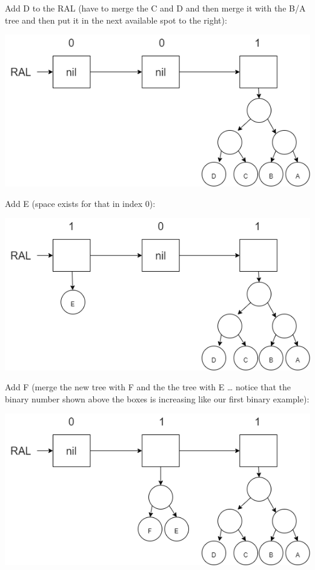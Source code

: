 \documentclass[
]{book}
\begin{document}
Add D to the RAL (have to merge the C and D and then merge it with the B/A tree and then put it in the next available spot to the right):

\includegraphics{images/ral4.drawio.png}

Add E (space exists for that in index 0):

\includegraphics{images/ral5.drawio.png}

Add F (merge the new tree with F and the the tree with E \ldots{} notice that the binary number shown above the boxes is increasing like our first binary example):

\includegraphics{images/ral6.drawio.png}
\end{document}
